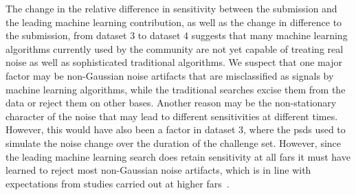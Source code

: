 The change in the relative difference in sensitivity between the \pycbc submission and the leading machine learning contribution, as well as the change in difference to the \cwb submission, from dataset 3 to dataset 4 suggests that many machine learning algorithms currently used by the community are not yet capable of treating real noise as well as sophisticated traditional algorithms. We suspect that one major factor may be non-Gaussian noise artifacts that are misclassified as signals by machine learning algorithms, while the traditional searches excise them from the data or reject them on other bases. Another reason may be the non-stationary character of the noise that may lead to different sensitivities at different times. However, this would have also been a factor in dataset 3, where the \acrshort{psd}s used to simulate the noise change over the duration of the challenge set. However, since the leading machine learning search does retain sensitivity at all \acrshort{far}s it must have learned to reject most non-Gaussian noise artifacts, which is in line with expectations from studies carried out at higher \acrshort{far}s~\cite{George:2017pmj, Gebhard:2019ldz, Krastev:2020skk, Wei:2020sfz}.


